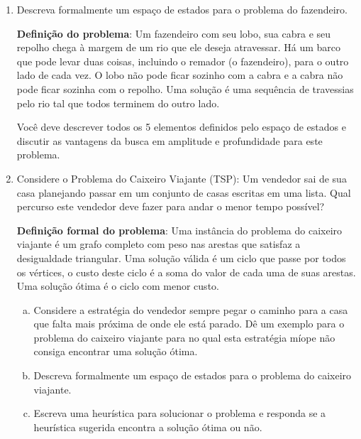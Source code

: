 \documentclass[12pt]{article}
\begin{document}
\begin{enumerate}

\item Descreva formalmente um espaço de estados para o problema do fazendeiro.

\textbf{Definição do problema}: Um fazendeiro com seu lobo, sua cabra e seu repolho chega à margem de um rio que ele deseja atravessar. Há um barco que pode levar duas coisas, incluindo o remador (o fazendeiro), para o outro lado de cada vez. O lobo não pode ficar sozinho com a cabra e a cabra não pode ficar sozinha com o repolho. Uma solução é uma sequência de travessias pelo rio tal que todos terminem do outro lado.

Você deve descrever todos os 5 elementos definidos pelo espaço de estados e discutir as vantagens da busca em amplitude e profundidade para este problema.



\break





\item Considere o Problema do Caixeiro Viajante (TSP): Um vendedor sai de sua casa planejando passar em um conjunto de casas escritas em uma lista. Qual percurso este vendedor deve fazer para andar o menor tempo possível?

\textbf{Definição formal do problema}: Uma instância do problema do caixeiro viajante é um grafo completo com peso nas arestas que satisfaz a desigualdade triangular. Uma solução válida é um ciclo que passe por todos os vértices, o custo deste ciclo é a soma do valor de cada uma de suas arestas. Uma solução ótima é o ciclo com menor custo.

\begin{enumerate}[a)]

\item Considere a estratégia do vendedor sempre pegar o caminho para a casa que falta mais próxima de onde ele está parado. Dê um exemplo para o problema do caixeiro viajante para no qual esta estratégia míope não consiga encontrar uma solução ótima. 

\item Descreva formalmente um espaço de estados para o problema do caixeiro viajante. 

\item Escreva uma heurística para solucionar o problema e responda se a heurística sugerida encontra a solução ótima ou não.\\
\end{enumerate}






\end{enumerate}
\end{document}
